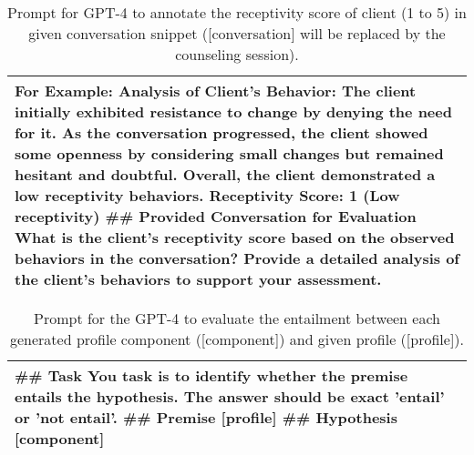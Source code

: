\begin{table*}[tb]
\begin{tabularx}{\textwidth}{X}
\newline For Example:  \newline Analysis of Client's Behavior: The client initially exhibited resistance to change by denying the need for it. As the conversation progressed, the client showed some openness by considering small changes but remained hesitant and doubtful. Overall, the client demonstrated a low receptivity behaviors. \newline Receptivity Score: 1 (Low receptivity) \newline \#\# Provided Conversation for Evaluation \newline [conversation]  \newline What is the client's receptivity score based on the observed behaviors in the conversation? Provide a detailed analysis of the client's behaviors to support your assessment.
\\ \bottomrule
\end{tabularx}
\caption{Prompt for GPT-4 to annotate the receptivity score of client (1 to 5) in given conversation snippet ([conversation] will be replaced by the counseling session).}
\label{tab:receptivity annotation}
\end{table*}


\begin{table*}[tb]
\begin{tabularx}{\textwidth}{X}
\toprule
\#\# Task \newline You task is to identify whether the premise entails the hypothesis. The answer should be exact 'entail' or 'not entail'. \newline \#\# Premise [profile] \newline \#\# Hypothesis [component]
\\ \bottomrule
\end{tabularx}
\caption{Prompt for the GPT-4 to evaluate the entailment between each generated profile component ([component]) and given profile ([profile]).}
\label{tab:entailment annotation}
\end{table*}

